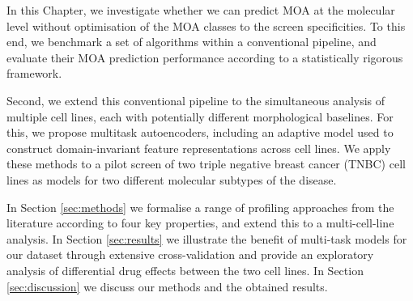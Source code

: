 In this Chapter, we investigate whether we can predict MOA at the molecular level without optimisation of the MOA classes to the screen specificities. To this end, we benchmark a set of algorithms within a conventional pipeline, and evaluate their MOA prediction performance according to a statistically rigorous framework.

Second, we extend this conventional pipeline to the simultaneous analysis of multiple cell lines, each with potentially different morphological baselines. For this, we propose multitask autoencoders, including an adaptive model used to construct domain-invariant feature representations across cell lines. We apply these methods to a pilot screen of two triple negative breast cancer (TNBC) cell lines as models for two different molecular subtypes of the disease.

In Section \ref{sec:methods} we formalise a range of profiling approaches from the literature according to four key properties, and extend this to a multi-cell-line analysis. In Section \ref{sec:results} we illustrate the benefit of multi-task models for our dataset through extensive cross-validation and provide an exploratory analysis of differential drug effects between the two cell lines. In Section \ref{sec:discussion} we discuss our methods and the obtained results.



